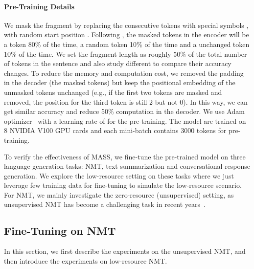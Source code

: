 \documentclass{article}
\begin{document}
	\paragraph{Pre-Training Details} We mask the fragment by replacing the consecutive tokens with special symbols , with random start position . Following \citet{devlin2018bert}, the masked tokens in the encoder will be a  token 80\% of the time, a random token 10\% of the time and a unchanged token 10\% of the time. We set the fragment length  as roughly 50\% of the total number of tokens in the sentence and also study different  to compare their accuracy changes. 
	To reduce the memory and computation cost, we removed the padding in the decoder (the masked tokens) but keep the positional embedding of the unmasked tokens unchanged (e.g., if the first two tokens are masked and removed, the position for the third token is still 2 but not 0). In this way, we can get similar accuracy and reduce 50\% computation in the decoder. We use Adam optimizer~\cite{kingma2015adam} with a learning rate of  for the pre-training. The model are trained on 8 NVIDIA V100 GPU cards and each mini-batch contains 3000 tokens for pre-training.


	To verify the effectiveness of MASS, we fine-tune the pre-trained model on three language generation tasks: NMT, text summarization and conversational response generation. We explore the low-resource setting on these tasks where we just leverage few training data for fine-tuning to simulate the low-resource scenario. For NMT, we mainly investigate the zero-resource (unsupervised) setting, as unsupervised NMT has become a challenging task in recent years~\citep{artetxe2017unsupervised,lample2017unsupervised,DBLP:conf/emnlp/LampleOCDR18}.
	




	
	\subsection{Fine-Tuning on NMT} 
	\label{sec_finetune_nmt}
	In this section, we first describe the experiments on the unsupervised NMT, and then introduce the experiments on low-resource NMT.
	
\end{document}
